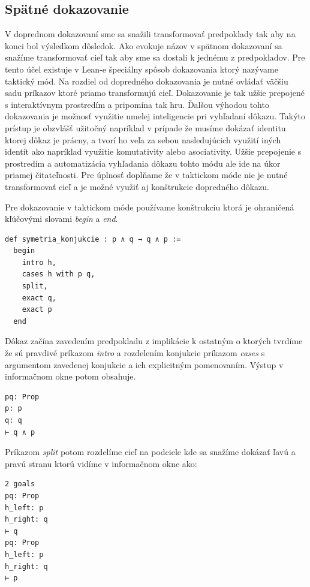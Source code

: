 \documentclass[a4paper,10pt,oneside]{report}%
\begin{document}
\subsection{Spätné dokazovanie}

    V doprednom dokazovaní sme sa snažili transformovať predpoklady tak aby na konci
bol výsledkom dôsledok.
    Ako evokuje názov v spätnom dokazovaní sa snažíme transformovať cieľ tak aby sme
sa dostali k jednému z predpokladov.
    Pre tento účel existuje v Lean-e špeciálny spôsob dokazovania ktorý nazývame taktický
mód.
    Na rozdiel od dopredného dokazovania je nutné ovládať väčšiu sadu príkazov ktoré
priamo transformujú cieľ.
    Dokazovanie je tak užšie prepojené s interaktívnym prostredím a pripomína tak hru.
    Ďalšou výhodou tohto dokazovania je možnosť využitie umelej inteligencie pri vyhľadaní
dôkazu.
    Takýto prístup je obzvlášť užitočný napríklad v prípade že musíme dokázať identitu
ktorej dôkaz je prácny, a tvorí ho veľa za sebou nasledujúcich využití iných
identít ako napríklad využitie komutativity alebo asociativity.
    Užšie prepojenie s prostredím a automatizácia vyhľadania dôkazu tohto módu ale
ide na úkor priamej čitateľnosti.
    Pre úplnosť doplňame že v taktickom móde nie je nutné transformovať cieľ a je možné
využiť aj konštrukcie dopredného dôkazu.

    Pre dokazovanie v taktickom móde používame konštrukciu ktorá je ohraničená
kľúčovými slovami \emph{begin} a \emph{end}.

\begin{lstlisting}
def symetria_konjukcie : p ∧ q → q ∧ p :=
  begin
    intro h,
    cases h with p q,
    split,
    exact q,
    exact p
  end
\end{lstlisting}

Dôkaz začína zavedením predpokladu z implikácie k ostatným o ktorých tvrdíme že
    sú pravdivé príkazom \emph{intro} a rozdelením konjukcie príkazom \emph{cases}
    s argumentom zavedenej konjukcie a ich explicitným pomenovaním.
Výstup v informačnom okne potom obsahuje.

\begin{lstlisting}
pq: Prop
p: p
q: q
⊢ q ∧ p
\end{lstlisting}

Príkazom \emph{split} potom rozdelíme cieľ na podciele kde sa snažíme dokázať
ľavú a pravú stranu ktorú vidíme v informačnom okne ako:

\begin{lstlisting}
2 goals
pq: Prop
h_left: p
h_right: q
⊢ q
pq: Prop
h_left: p
h_right: q
⊢ p
\end{lstlisting}
\end{document}
